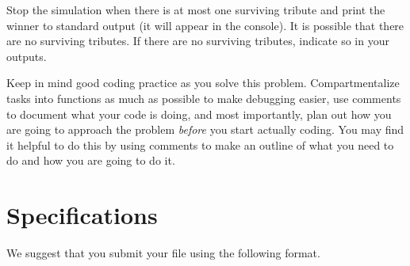 \begin{problem}
Stop the simulation when there is at most one surviving tribute and print the winner to standard output (it will appear in the console).  It is possible that there are no surviving tributes.  If there are no surviving tributes, indicate so in your outputs.

Keep in mind good coding practice as you solve this problem. Compartmentalize tasks into functions as much as possible to make debugging easier, use comments to document what your code is doing, and most importantly, plan out how you are going to approach the problem \emph{before} you start actually coding. You may find it helpful to do this by using comments to make an outline of what you need to do and how you are going to do it.

\end{problem}

\section*{Specifications}
We suggest that you submit your  file using the following format.





